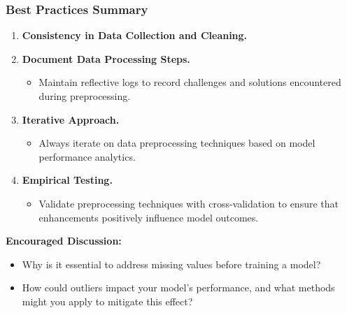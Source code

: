 \documentclass[aspectratio=169]{beamer}
\begin{document}
\begin{frame}[fragile]
    \frametitle{Best Practices Summary}
    \begin{enumerate}
        \item \textbf{Consistency in Data Collection and Cleaning.}
        \item \textbf{Document Data Processing Steps.}
            \begin{itemize}
                \item Maintain reflective logs to record challenges and solutions encountered during preprocessing.
            \end{itemize}
        \item \textbf{Iterative Approach.}
            \begin{itemize}
                \item Always iterate on data preprocessing techniques based on model performance analytics.
            \end{itemize}
        \item \textbf{Empirical Testing.}
            \begin{itemize}
                \item Validate preprocessing techniques with cross-validation to ensure that enhancements positively influence model outcomes.
            \end{itemize}
    \end{enumerate}

    \vspace{1em}
    \textbf{Encouraged Discussion:}
    \begin{itemize}
        \item Why is it essential to address missing values before training a model?
        \item How could outliers impact your model’s performance, and what methods might you apply to mitigate this effect?
    \end{itemize}
\end{frame}
\end{document}
